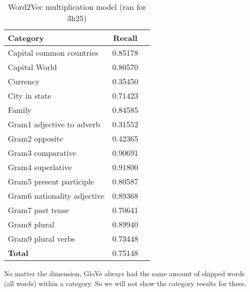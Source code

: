 \begin{center}
    \begin{table}[h!]
        \begin{tabular}{| l | c | r}
        	\hline
        	\textbf{Category} &    \textbf{Recall}\\ \hline
        	Capital common countries 	& 0.85178 \\
        	Capital World 				& 0.80570 \\
        	Currency					& 0.35450 \\
        	City in state				& 0.71423 \\
        	Family 						& 0.84585 \\
        	Gram1 adjective to adverb 	& 0.31552 \\
        	Gram2 opposite 				& 0.42365 \\
        	Gram3 comparative 			& 0.90691 \\
        	Gram4 superlative 			& 0.91800 \\
        	Gram5 present participle	& 0.80587 \\
        	Gram6 nationality adjective & 0.89368 \\
        	Gram7 past tense 			& 0.70641 \\
        	Gram8 plural 				& 0.89940 \\
        	Gram9 plural verbs 			& 0.73448 \\
        	\textbf{Total}				& 0.75148 \\ \hline
        \end{tabular}
    \caption{Word2Vec multiplication model (ran for 3h25)}
    \label{table:word2vec_multiplication}
    \end{table}
\end{center}

No matter the dimension, GloVe always had the same amount of skipped words (all words) within a category. So we will not show the category results for these.


